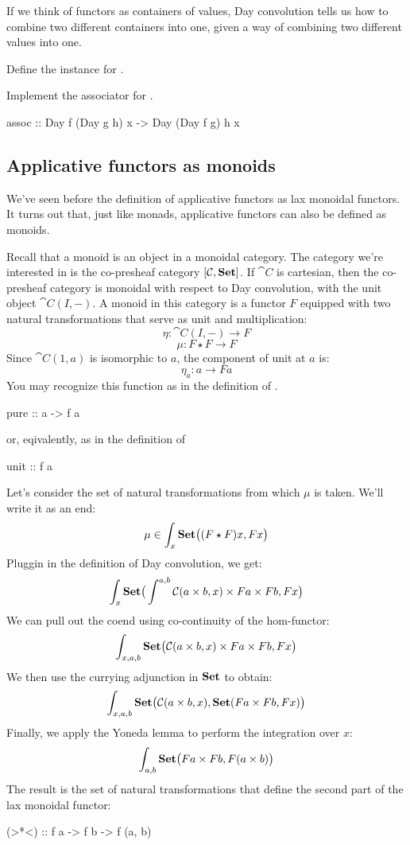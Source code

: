 \documentclass[DaoFP]{subfiles}
\begin{document}
If we think of functors as containers of values, Day convolution tells us how to combine two different containers into one, given a way of combining two different values into one. 

\begin{exercise}
Define the  instance for .
\end{exercise}

\begin{exercise}
Implement the associator for .
\begin{haskell}
assoc :: Day f (Day g h) x -> Day (Day f g) h x
\end{haskell}
\end{exercise}


\subsection{Applicative functors as monoids}
 
 We've seen before the definition of applicative functors as lax monoidal functors. It turns out that, just like monads, applicative functors can also be defined as monoids. 
 
Recall that a monoid is an object in a monoidal category. The category we're interested in is the co-presheaf category $[\mathcal{C}, \mathbf{Set}]$. If $\cat C$ is cartesian, then the co-presheaf category is monoidal with respect to Day convolution, with the unit object $\cat C(I, -)$. A monoid in this category is a functor $F$ equipped with two natural transformations that serve as unit and multiplication:
\[ \eta \colon \cat C(I, -) \to F \]
\[ \mu \colon F \star F \to F \]
Since $\cat C(1, a)$ is isomorphic to $a$, the component of unit at $a$ is:
\[ \eta_a \colon a \to F a \] 
You may recognize this function as  in the definition of .
\begin{haskell}
pure :: a -> f a
\end{haskell}
or, eqivalently, as  in the definition of 
\begin{haskell}
unit :: f a
\end{haskell}

Let's consider the set of natural transformations from which $\mu$ is taken. We'll write it as an end:
\[ \mu \in \int_x \mathbf{Set} \big( (F \star F) x, F x \big) \]
Pluggin in the definition of Day convolution, we get:
\[ \int_x \mathbf{Set} \big( \int^{a, b} \mathcal{C} (a \times b, x) \times F a \times  F b, F x \big) \]
We can pull out the coend using co-continuity of the hom-functor:
\[ \int_{x, a, b} \mathbf{Set} \big( \mathcal{C} (a \times b, x) \times F a \times  F b, F x \big) \]
We then use the currying adjunction in $\mathbf{Set}$ to obtain:
\[ \int_{x, a, b} \mathbf{Set} \big( \mathcal{C} (a \times b, x),  \mathbf{Set}( F a \times  F b, F x) \big) \]
Finally, we apply the Yoneda lemma to perform the integration over $x$:
\[ \int_{a, b}  \mathbf{Set} \big( F a \times  F b, F (a \times b) \big) \]
The result is the set of natural transformations that define the second part of the lax monoidal functor:
\begin{haskell}
  (>*<) :: f a -> f b -> f (a, b)
\end{haskell}
\end{document}
